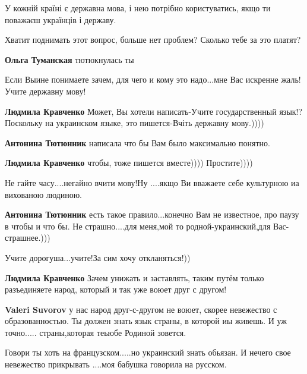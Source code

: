 \begin{itemize}
У кожній країні є державна мова, і нею потрібно користуватись, якщо ти поважаєш
українців і державу.

Хватит поднимать этот вопрос, больше нет проблем? Сколько тебе за это платят?

\textbf{Ольга Туманская} тютюкнулась ты


Если Выине понимаете зачем, для чего и кому это надо...мне Вас искренне
жаль!Учите державну мову!

\begin{itemize}


\textbf{Людмила Кравченко} Может, Вы хотели написать-Учите государственный
язык!? Поскольку на украинском языке, это пишется-Вчіть державну мову.))))

\textbf{Антонина Тютюнник} написала что бы Вам было максимально понятно.

\textbf{Людмила Кравченко} чтобы, тоже пишется вместе)))) Простите))))

Не гайте часу....негайно вчити мову!Ну ....якщо Ви вважаете себе культурною иа вихованою людиною.

\textbf{Антонина Тютюнник} есть такое правило...конечно Вам не известное, про
паузу в чтобы и что бы. Не страшно....для меня,мой то родной-украинский,для
Вас-страшнее.)))

Учите дорогуша...учите!За сим хочу откланяться!))

\textbf{Людмила Кравченко} Зачем унижать и заставлять,
таким путём только разъединяете народ, который и так уже воюет друг с другом!


\textbf{Valeri Suvorov} у нас народ друг-с-другом не воюет, скорее невежество с
образованностью. Ты должен знать язык страны, в которой иы живешь. И уж
точно..... страны,которая теьюбе Родиной зовется.


Говори ты хоть на французском.....но украинский знать обьязан. И нечего свое
невежество прикрывать ....моя бабушка говорила на русском.



\end{itemize}
\end{itemize}
